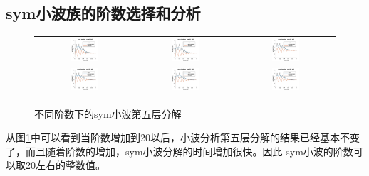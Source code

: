 \subsection{sym小波族的阶数选择和分析}
\begin{figure}[H]
	\centering
	\begin{tabular}{ccc}
		\includegraphics[width=0.3\textwidth]{thesis_figure/ion_chapter/sym5_lvl5}&
		\includegraphics[width=0.3\textwidth]{thesis_figure/ion_chapter/sym10_lvl5}&
		\includegraphics[width=0.3\textwidth]{thesis_figure/ion_chapter/sym15_lvl5}\\
		\includegraphics[width=0.3\textwidth]{thesis_figure/ion_chapter/sym20_lvl5}&
		\includegraphics[width=0.3\textwidth]{thesis_figure/ion_chapter/sym25_lvl5}&
		\includegraphics[width=0.3\textwidth]{thesis_figure/ion_chapter/sym30_lvl5}
	\end{tabular}
	\caption{\label{fig:symvar}不同阶数下的sym小波第五层分解}
\end{figure}
从图\ref{fig:symvar}中可以看到当阶数增加到20以后，小波分析第五层分解的结果已经基本不变了，而且随着阶数的增加，sym小波分解的时间增加很快。因此
sym小波的阶数可以取20左右的整数值。
